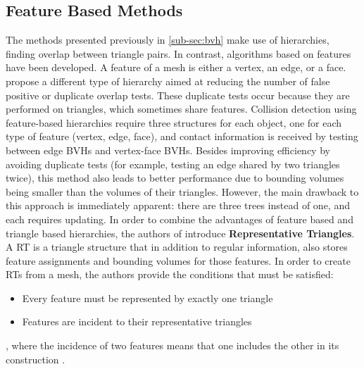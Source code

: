 \FloatBarrier
\subsection{Feature Based Methods}
\label{sub-sec:feature}

The methods presented previously in \autoref{sub-sec:bvh} make use of hierarchies, finding overlap between triangle pairs. In contrast, algorithms based on features have been developed. A feature of a mesh is either a vertex, an edge, or a face. \citep{curtis2008} propose a different type of hierarchy aimed at reducing the number of false positive or duplicate overlap tests. These duplicate tests occur because they are performed on triangles, which sometimes share features. Collision detection using feature-based hierarchies require three structures for each object, one for each type of feature (vertex, edge, face), and contact information is received by testing between edge BVHs and vertex-face BVHs. Besides improving efficiency by avoiding duplicate tests (for example, testing an edge shared by two triangles twice), this method also leads to better performance due to bounding volumes being smaller than the volumes of their triangles. However, the main drawback to this approach is immediately apparent: there are three trees instead of one, and each requires updating. In order to combine the advantages of feature based and triangle based hierarchies, the authors of \citep{curtis2008} introduce \textbf{Representative Triangles}. A RT is a triangle structure that in addition to regular information, also stores feature assignments and bounding volumes for those features. In order to create RTs from a mesh, the authors provide the conditions that must be satisfied:

\begin{itemize}
	\item Every feature must be represented by exactly one triangle
	\item Features are incident to their representative triangles
\end{itemize}

, where the incidence of two features means that one includes the other in its construction \citep{curtis2008}. 


